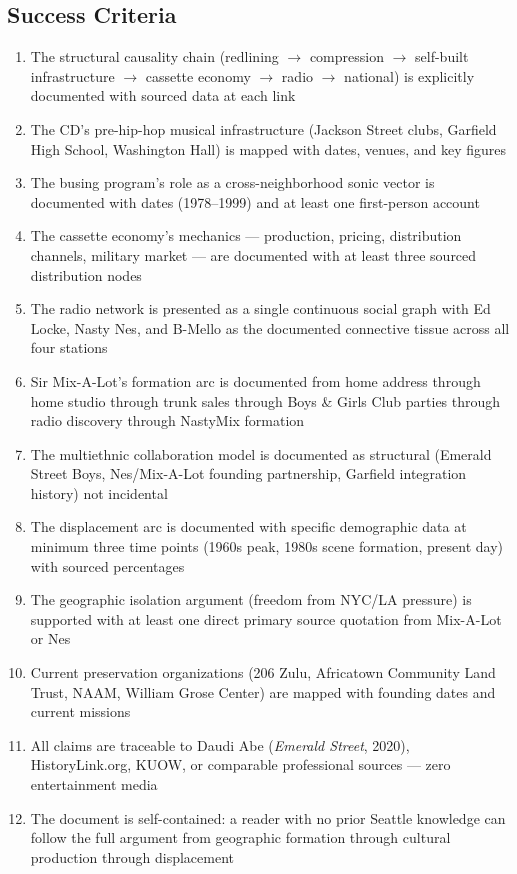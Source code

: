 \documentclass[11pt,letterpaper]{article}
\begin{document}
\subsection{Success Criteria}

\begin{enumerate}
  \item The structural causality chain (redlining $\rightarrow$ compression $\rightarrow$ self-built infrastructure $\rightarrow$ cassette economy $\rightarrow$ radio $\rightarrow$ national) is explicitly documented with sourced data at each link
  \item The CD's pre-hip-hop musical infrastructure (Jackson Street clubs, Garfield High School, Washington Hall) is mapped with dates, venues, and key figures
  \item The busing program's role as a cross-neighborhood sonic vector is documented with dates (1978--1999) and at least one first-person account
  \item The cassette economy's mechanics --- production, pricing, distribution channels, military market --- are documented with at least three sourced distribution nodes
  \item The radio network is presented as a single continuous social graph with Ed Locke, Nasty Nes, and B-Mello as the documented connective tissue across all four stations
  \item Sir Mix-A-Lot's formation arc is documented from home address through home studio through trunk sales through Boys \& Girls Club parties through radio discovery through NastyMix formation
  \item The multiethnic collaboration model is documented as structural (Emerald Street Boys, Nes/Mix-A-Lot founding partnership, Garfield integration history) not incidental
  \item The displacement arc is documented with specific demographic data at minimum three time points (1960s peak, 1980s scene formation, present day) with sourced percentages
  \item The geographic isolation argument (freedom from NYC/LA pressure) is supported with at least one direct primary source quotation from Mix-A-Lot or Nes
  \item Current preservation organizations (206 Zulu, Africatown Community Land Trust, NAAM, William Grose Center) are mapped with founding dates and current missions
  \item All claims are traceable to Daudi Abe (\textit{Emerald Street}, 2020), HistoryLink.org, KUOW, or comparable professional sources --- zero entertainment media
  \item The document is self-contained: a reader with no prior Seattle knowledge can follow the full argument from geographic formation through cultural production through displacement
\end{enumerate}
\end{document}
